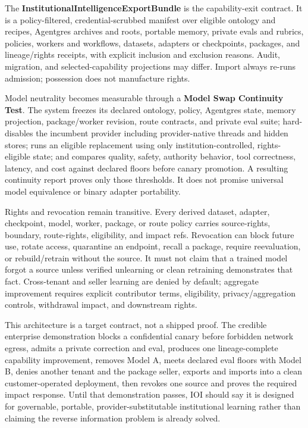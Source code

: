 \documentclass[
  11pt,
]{article}
\begin{document}
The \textbf{InstitutionalIntelligenceExportBundle} is the capability-exit
contract. It is a policy-filtered, credential-scrubbed manifest over eligible
ontology and recipes, Agentgres archives and roots, portable memory, private
evals and rubrics, policies, workers and workflows, datasets, adapters or
checkpoints, packages, and lineage/rights receipts, with explicit inclusion and
exclusion reasons. Audit, migration, and selected-capability projections may
differ. Import always re-runs admission; possession does not manufacture rights.

Model neutrality becomes measurable through a \textbf{Model Swap Continuity
Test}. The system freezes its declared ontology, policy, Agentgres state, memory
projection, package/worker revision, route contracts, and private eval suite;
hard-disables the incumbent provider including provider-native threads and
hidden stores; runs an eligible replacement using only institution-controlled,
rights-eligible state; and compares quality, safety, authority behavior, tool
correctness, latency, and cost against declared floors before canary promotion.
A resulting continuity report proves only those thresholds. It does not promise
universal model equivalence or binary adapter portability.

Rights and revocation remain transitive. Every derived dataset, adapter,
checkpoint, model, worker, package, or route policy carries source-rights,
boundary, route-rights, eligibility, and impact refs. Revocation can block future
use, rotate access, quarantine an endpoint, recall a package, require
reevaluation, or rebuild/retrain without the source. It must not claim that a
trained model forgot a source unless verified unlearning or clean retraining
demonstrates that fact. Cross-tenant and seller learning are denied by default;
aggregate improvement requires explicit contributor terms, eligibility,
privacy/aggregation controls, withdrawal impact, and downstream rights.

This architecture is a target contract, not a shipped proof. The credible
enterprise demonstration blocks a confidential canary before forbidden network
egress, admits a private correction and eval, produces one lineage-complete
capability improvement, removes Model A, meets declared eval floors with Model
B, denies another tenant and the package seller, exports and imports into a clean
customer-operated deployment, then revokes one source and proves the required
impact response. Until that demonstration passes, IOI should say it is designed
for governable, portable, provider-substitutable institutional learning rather
than claiming the reverse information problem is already solved.
\end{document}
